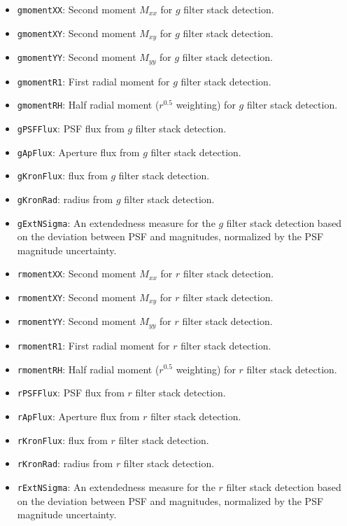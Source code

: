 \documentclass[twocolumn]{aastex63}
\begin{document}
\begin{itemize}
    \item \texttt{gmomentXX}: Second moment $M_{xx}$ for $g$ filter stack detection. 
    \item \texttt{gmomentXY}: Second moment $M_{xy}$ for $g$ filter stack detection. 
    \item \texttt{gmomentYY}: Second moment $M_{yy}$ for $g$ filter stack detection. 
    \item \texttt{gmomentR1}: First radial moment for $g$ filter stack detection.
    \item \texttt{gmomentRH}: Half radial moment ($r^{0.5}$ weighting) for $g$ filter stack detection.
    \item \texttt{gPSFFlux}: PSF flux from $g$ filter stack detection.
    \item \texttt{gApFlux}: Aperture flux from $g$ filter stack detection.
    \item \texttt{gKronFlux}: \cite{Kron1980} flux from $g$ filter stack detection.
    \item \texttt{gKronRad}: \cite{Kron1980} radius from $g$ filter stack detection.
    \item \texttt{gExtNSigma}: An extendedness measure for the $g$ filter stack detection based on the deviation between PSF and \cite{Kron1980} magnitudes, normalized by the PSF magnitude uncertainty.
    \item \texttt{rmomentXX}: Second moment $M_{xx}$ for $r$ filter stack detection. 
    \item \texttt{rmomentXY}: Second moment $M_{xy}$ for $r$ filter stack detection. 
    \item \texttt{rmomentYY}: Second moment $M_{yy}$ for $r$ filter stack detection. 
    \item \texttt{rmomentR1}: First radial moment for $r$ filter stack detection.
    \item \texttt{rmomentRH}: Half radial moment ($r^{0.5}$ weighting) for $r$ filter stack detection.
    \item \texttt{rPSFFlux}: PSF flux from $r$ filter stack detection.
    \item \texttt{rApFlux}: Aperture flux from $r$ filter stack detection.
    \item \texttt{rKronFlux}: \cite{Kron1980} flux from $r$ filter stack detection.
    \item \texttt{rKronRad}: \cite{Kron1980} radius from $r$ filter stack detection.
    \item \texttt{rExtNSigma}: An extendedness measure for the $r$ filter stack detection based on the deviation between PSF and \cite{Kron1980} magnitudes, normalized by the PSF magnitude uncertainty.

\end{itemize}
\end{document}
